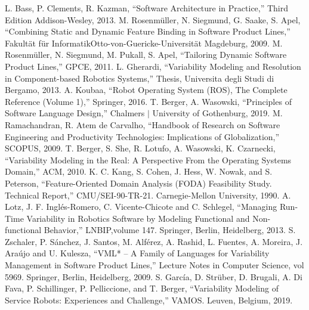 \documentclass[conference]{IEEEtran}
\begin{document}
\begin{thebibliography}{00}
 L. Bass, P. Clements, R. Kazman, ``Software Architecture in Practice,'' Third Edition Addison-Wesley, 2013.
 M. Rosenmüller, N. Siegmund, G. Saake, S. Apel, ``Combining Static and Dynamic Feature Binding in
Software Product Lines,'' Fakultät für InformatikOtto-von-Guericke-Universität Magdeburg, 2009.
 M. Rosenmüller, N. Siegmund, M. Pukall, S. Apel, ``Tailoring Dynamic Software Product Lines,'' GPCE, 2011.
 L. Gherardi, ``Variability Modeling and Resolution in Component-based Robotics Systems,'' Thesis,  Universita degli Studi di Bergamo, 2013.
 A. Koubaa, ``Robot Operating System (ROS), The Complete Reference (Volume 1),'' Springer, 2016.
 T. Berger, A. Wasowski, ``Principles of Software Language Design,'' Chalmers $|$ University of Gothenburg, 2019.
 M. Ramachandran, R. Atem de Carvalho, ``Handbook of Research on Software Engineering and Productivity Technologies: Implications of Globalization,'' SCOPUS, 2009.
 T. Berger, S. She, R. Lotufo, A. Wasowski, K. Czarnecki, ``Variability Modeling in the Real: A Perspective From the Operating Systems Domain,'' ACM, 2010.
 K. C. Kang, S. Cohen, J. Hess, W. Nowak, and S. Peterson, ``Feature-Oriented Domain Analysis (FODA) Feasibility Study. Technical
Report,'' CMU/SEI-90-TR-21. Carnegie-Mellon University, 1990.
 A. Lotz, J. F. Ingl\'{e}s-Romero, C. Vicente-Chicote and C. Schlegel, ``Managing Run-Time Variability in Robotics Software by Modeling Functional and Non-functional Behavior,'' LNBIP,volume 147. Springer, Berlin, Heidelberg, 2013.
 S. Zschaler, P. S\'{a}nchez, J. Santos, M. Alf\'{e}rez, A. Rashid, L. Fuentes, A. Moreira, J. Ara\'{u}jo and U. Kulesza, ``VML* – A Family of Languages for Variability
Management in Software Product Lines,'' Lecture Notes in Computer Science, vol 5969. Springer, Berlin, Heidelberg, 2009.
 S. Garc\'{i}a, D. Strüber,  D. Brugali, A. Di Fava, P. Schillinger, P. Pelliccione, and T. Berger, ``Variability Modeling of Service Robots: Experiences and Challenge,'' VAMOS. Leuven, Belgium, 2019.
\end{thebibliography}
\vspace{12pt}
\end{document}
